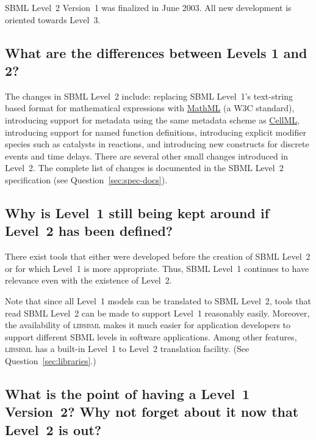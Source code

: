 \documentclass{sbmlfaq}
\begin{document}
SBML Level~2 Version~1 was finalized in June 2003.  All new development is
oriented towards Level~3.


\subsection{What are the differences between Levels 1 and 2?}

The changes in SBML Level~2 include: replacing SBML Level~1's text-string
based format for mathematical expressions with
\href{http://www.w3.org/TR/2003/WD-MathML2-20030411/}{MathML} (a W3C
standard), introducing support for metadata using the same metadata scheme
as \href{http://www.cellml.org}{CellML}, introducing support for named
function definitions, introducing explicit modifier species such as
catalysts in reactions, and introducing new constructs for discrete events
and time delays.  There are several other small changes introduced in
Level~2.  The complete list of changes is documented in the SBML Level~2
specification (see Question~\ref{sec:spec-docs}).


\subsection{Why is Level~1 still being kept around if Level~2 has been defined?}
\label{sec:why-keep-level-1}

There exist tools that either were developed before the creation of SBML
Level~2 or for which Level~1 is more appropriate.  Thus, SBML Level~1
continues to have relevance even with the existence of Level~2.  

Note that since all Level~1 models can be translated to SBML Level~2, tools
that read SBML Level~2 can be made to support Level~1 reasonably easily.
Moreover, the availability of \textsc{libsbml} makes it much easier for
application developers to support different SBML levels in software
applications.  Among other features, \textsc{libsbml} has a built-in
Level~1 to Level~2 translation facility.  (See
Question~\ref{sec:libraries}.)


\subsection{What is the point of having a Level~1 Version~2?  Why not
  forget about it now that Level~2 is out?}
\end{document}
